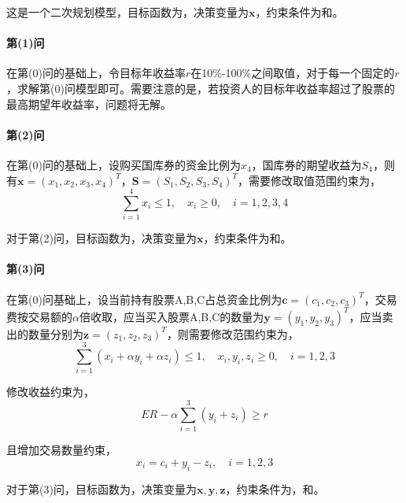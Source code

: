 \documentclass[12pt,a4paper]{article}
\begin{document}
这是一个二次规划模型，目标函数为，决策变量为$\boldsymbol{x}$，约束条件为和。

\paragraph{第(1)问} 在第(0)问的基础上，令目标年收益率$r$在10\%-100\%之间取值，对于每一个固定的$r$，求解第(0)问模型即可。需要注意的是，若投资人的目标年收益率超过了股票的最高期望年收益率，问题将无解。

\paragraph{第(2)问} 在第(0)问的基础上，设购买国库券的资金比例为$x_4$，国库券的期望收益为$S_4$，则有$\boldsymbol{x} = (x_1,x_2,x_3,x_4)^T$，$\boldsymbol{S} = (S_1, S_2, S_3, S_4)^T$，需要修改取值范围约束为，
\begin{equation}\label{eq:ex8_cons_range_2}
    \sum_{i=1}^4 x_i \le 1, \quad x_i \ge 0, \quad i = 1,2,3,4
\end{equation}

对于第(2)问，目标函数为，决策变量为$\boldsymbol{x}$，约束条件为和。

\paragraph{第(3)问} 在第(0)问基础上，设当前持有股票A,B,C占总资金比例为$\boldsymbol{c} = (c_1,c_2,c_3)^T$，交易费按交易额的$\alpha$倍收取，应当买入股票A,B,C的数量为$\boldsymbol{y}=(y_1,y_2,y_3)^T$，应当卖出的数量分别为$\boldsymbol{z}=(z_1, z_2, z_3)^T$，则需要修改范围约束为，
\begin{equation}\label{eq:ex8_cons_range_3}
    \sum_{i=1}^3 (x_i + \alpha y_i + \alpha z_i)\le 1, \quad x_i,y_i,z_i \ge 0, \quad i = 1,2,3
\end{equation}

修改收益约束为，
\begin{equation}\label{eq:ex8_cons_profit_3}
    ER - \alpha\sum_{i=1}^3(y_i + z_i) \ge r
\end{equation}

且增加交易数量约束，
\begin{equation}\label{eq:ex8_cons_trans_3}
    x_i = c_i + y_i - z_i, \quad i = 1,2,3
\end{equation}

对于第(3)问，目标函数为，决策变量为$\boldsymbol{x}, \boldsymbol{y}, \boldsymbol{z}$，约束条件为，和。
\end{document}

